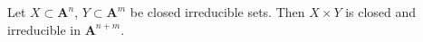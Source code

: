 Let $X \subset \mathbf{A}^n$, $Y \subset \mathbf{A}^m$ be closed irreducible sets. Then $X \times Y$ is closed and irreducible in $\mathbf{A}^{n+m}$.
